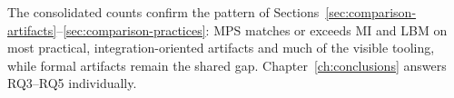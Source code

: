 The consolidated counts confirm the pattern of Sections~\ref{sec:comparison-artifacts}--\ref{sec:comparison-practices}: MPS matches or exceeds MI and LBM on most practical, integration-oriented artifacts and much of the visible tooling, while formal artifacts remain the shared gap. Chapter~\ref{ch:conclusions} answers RQ3--RQ5 individually.
